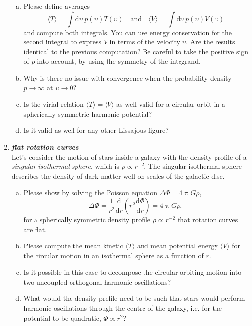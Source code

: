 \documentclass[a4paper,12pt]{article}
\newcommand{\question}[1]{\textbf{\textit{#1}}}
\newcommand{\dd}{\mathrm{d}}
\renewcommand{\pi}{\uppi}
\newcommand{\bra}{\langle}
\newcommand{\ket}{\rangle}
\begin{document}
\begin{enumerate}
\begin{enumerate}[(a)]
\item{Please define averages
\begin{equation}
\bra T\ket = \int\dd\upsilon\:p(\upsilon)T(\upsilon)
\quad\mathrm{and}\quad
\bra V\ket = \int\dd\upsilon\:p(\upsilon)V(\upsilon)
\end{equation}
and compute both integrals. You can use energy conservation for the second integral to express $V$ in terms of the velocity $\upsilon$. Are the results identical to the previous computation? Be careful to take the positive sign of $p$ into account, by using the symmetry of the integrand.
}
\item{Why is there no issue with convergence when the probability density $p\rightarrow\infty$ at $\upsilon\rightarrow0$?}
\item{Is the virial relation $\bra T\ket = \bra V\ket$ as well valid for a circular orbit in a spherically symmetric harmonic potential?}
\item{Is it valid as well for any other Lissajous-figure?}
\end{enumerate}


\item \question{flat rotation curves}\\
Let's consider the motion of stars inside a galaxy with the density profile of a {\em singular isothermal sphere}, which is $\rho\propto r^{-2}$. The singular isothermal sphere describes the density of dark matter well on scales of the galactic disc.
\begin{enumerate}[(a)]
\item{Please show by solving the Poisson equation $\Delta\Phi = 4\pi G\rho$,
\begin{equation}
\Delta\Phi = \frac{1}{r^2}\frac{\dd}{\dd r}\left(r^2\frac{\dd\Phi}{\dd r}\right) = 4\pi G\rho,
\end{equation}
for a spherically symmetric density profile $\rho\propto r^{-2}$ that rotation curves are flat.}
\item{Please compute the mean kinetic $\bra T\ket$ and mean potential energy $\bra V\ket$ for the circular motion in an isothermal sphere as a function of $r$.}
\item{Is it possible in this case to decompose the circular orbiting motion into two uncoupled orthogonal harmonic oscillations?}
\item{What would the density profile need to be such that stars would perform harmonic oscillations through the centre of the galaxy, i.e. for the potential to be quadratic, $\Phi\propto r^{2}$?}
\end{enumerate}



\end{enumerate}
\end{document}
